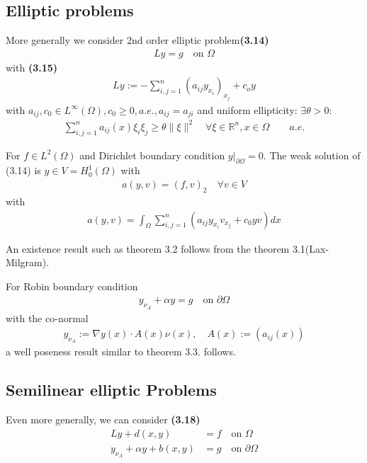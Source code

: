 \documentclass[a4paper,11pt,fleqn]{book}
\theoremstyle{definition}
\theoremstyle{remark}
\begin{document}
\subsection{Elliptic problems}
More generally we consider 2nd order elliptic problem\textbf{(3.14)}
\begin{align*}
	Ly = g \quad \text{on } \Omega
\end{align*}
with \textbf{(3.15)}
\begin{align*}
	Ly := - \sum_{i, j= 1}^n (a_{ij} y_{x_i})_{x_j} + c_o y 
\end{align*}
with $a_{ij}, c_0 \in L^\infty(\Omega), c_0 \ge 0, a.e., a_{ij} = a_{ji}$
and uniform ellipticity: $\exists \theta > 0$:
\begin{align*}
	\sum_{i, j = 1}^n a_{ij} (x) \xi_i \xi_j \ge \theta \|\xi\|^2 \quad \forall \xi \in \mathbb{R}^n, x \in \Omega \qquad a.e.
\end{align*}

For $f \in L^2(\Omega)$ and Dirichlet boundary condition $y|_{\partial \Omega} = 0$. The weak solution of (3.14) is $y \in V = H^1_0(\Omega)$ with 
\begin{align*}
	a(y, v) = (f, v)_2 \quad \forall v \in V
\end{align*}
with 
\begin{align*}
	a(y, v) = \int_\Omega \sum_{i, j =1}^n (a_{ij}y_{x_i} v_{x_j} + c_0 yv)dx
\end{align*}

An existence result such as theorem 3.2 follows from the theorem 3.1(Lax-Milgram). \par 
For Robin boundary condition
\begin{align*}
	y_{\nu_A} + \alpha y = g \quad \text{on } \partial \Omega
\end{align*}
with the co-normal
\begin{align*}
	y_{\nu_A} := \nabla y(x) \cdot A(x) \nu(x), \quad A(x) := (a_{ij}(x))
\end{align*}
a well poseness result similar to theorem 3.3. follows. 


\subsection{Semilinear elliptic Problems}
Even more generally, we can consider \textbf{(3.18)}
\begin{align*}
	Ly + d(x, y) &= f \quad \text{on }\Omega\\
	y_{\nu_A} + \alpha y + b(x, y) &= g \quad \text{on } \partial \Omega
\end{align*}
\end{document}
